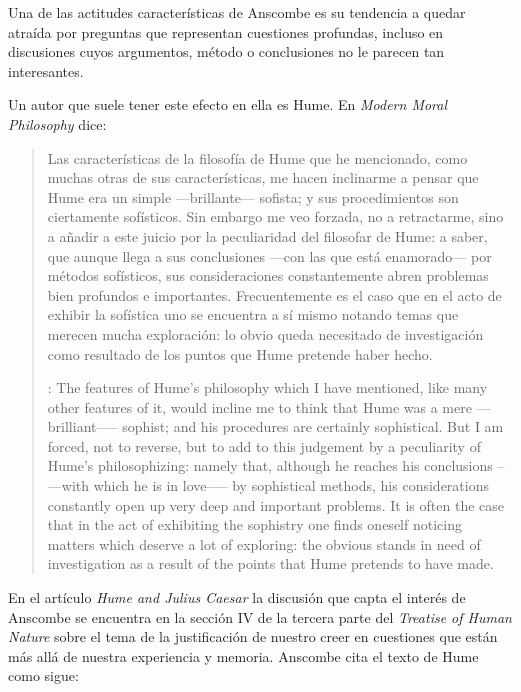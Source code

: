  Una de las actitudes características de Anscombe es su tendencia a quedar
  atraída por preguntas que representan cuestiones profundas, incluso en
  discusiones cuyos argumentos, método o conclusiones no le parecen tan
  interesantes.

  Un autor que suele tener este efecto en ella es Hume. En \emph{Modern Moral
    Philosophy} dice:

  \blockquote[{\cite[172]{anscombe1981mmph}}: The features of Hume’s philosophy
  which I have mentioned, like many other features of it, would incline me to
  think that Hume was a mere ---brilliant--— sophist; and his procedures are
  certainly sophistical. But I am forced, not to reverse, but to add to this
  judgement by a peculiarity of Hume’s philosophizing: namely that, although he
  reaches his conclusions --—with which he is in love--— by sophistical methods,
  his considerations constantly open up very deep and important problems. It is
  often the case that in the act of exhibiting the sophistry one finds oneself
  noticing matters which deserve a lot of exploring: the obvious stands in need of
  investigation as a result of the points that Hume pretends to have made.]{Las
    características de la filosofía de Hume que he mencionado, como muchas otras
    de sus características, me hacen inclinarme a pensar que Hume era un simple
    ---brillante--- sofista; y sus procedimientos son ciertamente sofísticos. Sin
    embargo me veo forzada, no a retractarme, sino a añadir a este juicio por la
    peculiaridad del filosofar de Hume: a saber, que aunque llega a sus
    conclusiones ---con las que está enamorado--- por métodos sofísticos, sus
    consideraciones constantemente abren problemas bien profundos e importantes.
    Frecuentemente es el caso que en el acto de exhibir la sofística uno se
    encuentra a sí mismo notando temas que merecen mucha exploración: lo obvio
    queda necesitado de investigación como resultado de los puntos que Hume
    pretende haber hecho.}

En el artículo \emph{Hume and Julius Caesar} la discusión que capta el interés
de Anscombe se encuentra en la sección IV de la tercera parte del \emph{Treatise
  of Human Nature} sobre el tema de la justificación de nuestro creer en
cuestiones que están más allá de nuestra experiencia y memoria. Anscombe cita el
texto de Hume como sigue:

